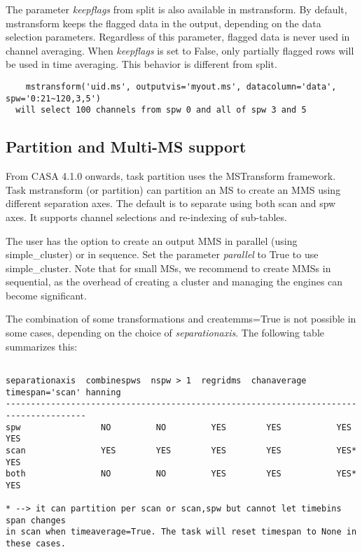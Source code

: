 The parameter {\it keepflags} from split is also available in mstransform. By
default, mstransform keeps the flagged data in the output, depending on the data
selection parameters. Regardless of this parameter, flagged data is never used
in channel averaging. When {\it keepflags} is set to False, only partially
flagged rows will be used in time averaging. This behavior is different from
split.

\begin{verbatim}
    mstransform('uid.ms', outputvis='myout.ms', datacolumn='data', spw='0:21~120,3,5')
  will select 100 channels from spw 0 and all of spw 3 and 5
\end{verbatim}

\subsection{Partition and Multi-MS support}
From CASA 4.1.0 onwards, task partition uses the MSTransform framework.
Task mstransform (or partition) can partition an MS to create an MMS using
different separation axes. The default is to separate using both scan and spw axes.
It supports channel selections and re-indexing of sub-tables. 

The user has the option to create an output MMS in parallel (using simple_cluster) or
in sequence. Set the parameter {\it parallel} to True to use simple_cluster.
Note that for small MSs, we recommend to create MMSs in sequential, as the overhead of creating
a cluster and managing the engines can become significant.

The combination of some transformations and createmms=True is not possible in
some cases, depending on the choice of {\it separationaxis}. The following table summarizes this:

\begin{verbatim}

separationaxis  combinespws  nspw > 1  regridms  chanaverage  timespan='scan' hanning
--------------------------------------------------------------------------------------
spw                NO         NO         YES        YES           YES           YES
scan               YES        YES        YES        YES           YES*          YES
both               NO         NO         YES        YES           YES*          YES

* --> it can partition per scan or scan,spw but cannot let timebins span changes
in scan when timeaverage=True. The task will reset timespan to None in these cases.

\end{verbatim}

